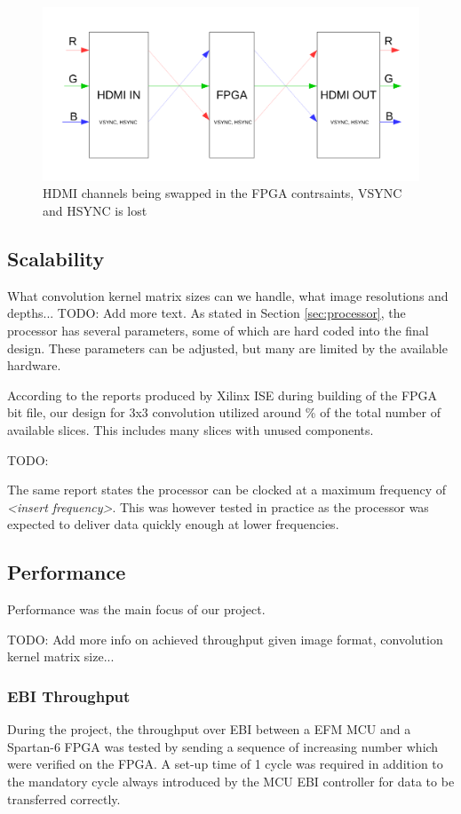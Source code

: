 \begin{figure}[h!]
    \includegraphics[width=\linewidth]{img/hdmi_channel_path.pdf}
    \caption{HDMI channels being swapped in the FPGA contrsaints, VSYNC and HSYNC is lost}
    \label{fig:hdmiChannelPath}
\end{figure}

\subsection{Scalability}
What convolution kernel matrix sizes can we handle, what image resolutions and depths... TODO: Add more text.
As stated in Section \ref{sec:processor}, the processor has several parameters, some of which are hard coded into the final design.
These parameters can be adjusted, but many are limited by the available hardware.

According to the reports produced by Xilinx ISE during building of the FPGA bit file, our design for 3x3 convolution utilized around \unit[16]{\%} of the total number of available slices.
This includes many slices with unused components.

TODO:

The same report states the processor can be clocked at a maximum frequency of \emph{<insert frequency>}. This was however tested in practice as the processor was expected to deliver data quickly enough at lower frequencies.

\subsection{Performance}
Performance was the main focus of our project.

TODO: Add more info on achieved throughput given image format, convolution kernel matrix size...

\subsubsection{EBI Throughput} \label{subsec:EbiThroughput}
During the project, the throughput over EBI between a EFM MCU and a Spartan-6 FPGA was tested by sending a sequence of increasing number which were verified on the FPGA.
A set-up time of 1 cycle was required in addition to the mandatory cycle always introduced by the MCU EBI controller for data to be transferred correctly.

